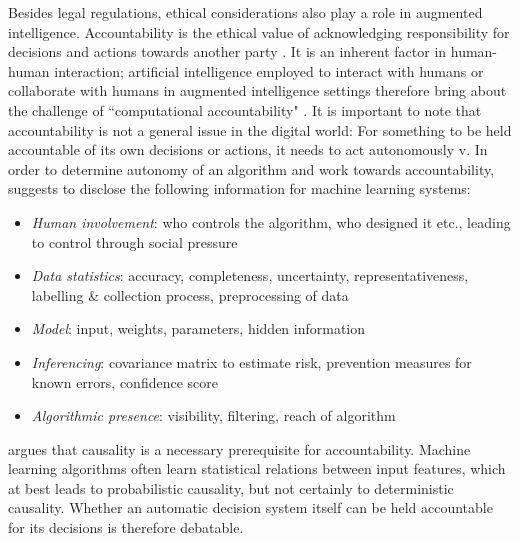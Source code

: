 Besides legal regulations, ethical considerations also play a role in augmented intelligence. Accountability is the ethical value of acknowledging responsibility for decisions and actions towards another party \cite{baldoni2016computational}. It is an inherent factor in human-human interaction; artificial intelligence employed to interact with humans or collaborate with humans in augmented intelligence settings therefore bring about the challenge of ``computational accountability" \cite{baldoni2016computational}. It is important to note that accountability is not a general issue in the digital world: For something to be held accountable of its own decisions or actions, it needs to act autonomously v. In order to determine autonomy of an algorithm and work towards accountability, \cite{diakopoulos2016accountability} suggests to disclose the following information for machine learning systems: 
\begin{itemize}
	\item \textit{Human involvement}: who controls the algorithm, who designed it etc., leading to control through social pressure
	\item \textit{Data statistics}: accuracy, completeness, uncertainty, representativeness, labelling \& collection process, preprocessing of data
	\item \textit{Model}: input, weights, parameters, hidden information
	\item \textit{Inferencing}: covariance matrix to estimate risk, prevention measures for known errors, confidence score 
	\item \textit{Algorithmic presence}: visibility, filtering, reach of algorithm
\end{itemize}
\cite{baldoni2016computational} argues that causality is a necessary prerequisite for accountability. Machine learning algorithms often learn statistical relations between input features, which at best leads to probabilistic causality, but not certainly to deterministic causality. Whether an automatic decision system itself can be held accountable for its decisions is therefore debatable.







